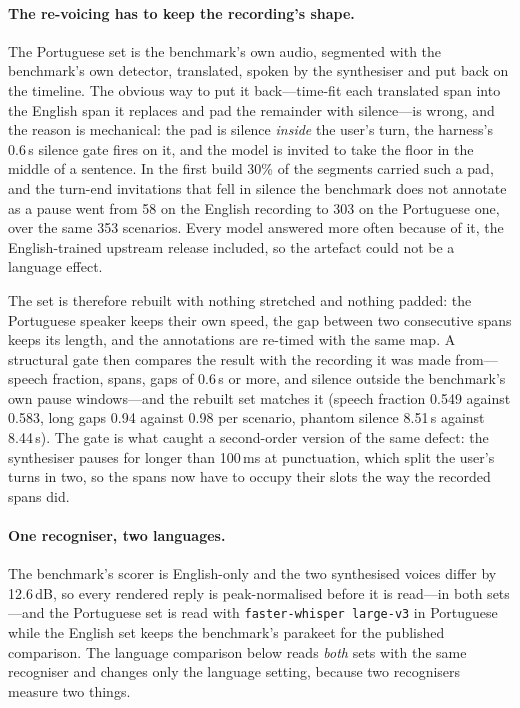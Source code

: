 \documentclass[conference]{IEEEtran}
\begin{document}
\paragraph{The re-voicing has to keep the recording's shape.} The Portuguese set
is the benchmark's own audio, segmented with the benchmark's own detector,
translated, spoken by the synthesiser and put back on the timeline. The obvious
way to put it back---time-fit each translated span into the English span it
replaces and pad the remainder with silence---is wrong, and the reason is
mechanical: the pad is silence \emph{inside} the user's turn, the harness's
0.6\,s silence gate fires on it, and the model is invited to take the floor in
the middle of a sentence. In the first build 30\% of the segments carried such a
pad, and the turn-end invitations that fell in silence the benchmark does not
annotate as a pause went from 58 on the English recording to 303 on the
Portuguese one, over the same 353 scenarios. Every model answered more often
because of it, the English-trained upstream release included, so the artefact
could not be a language effect.

The set is therefore rebuilt with nothing stretched and nothing padded: the
Portuguese speaker keeps their own speed, the gap between two consecutive spans
keeps its length, and the annotations are re-timed with the same map. A
structural gate then compares the result with the recording it was made from---speech
fraction, spans, gaps of 0.6\,s or more, and silence outside the benchmark's own
pause windows---and the rebuilt set matches it (speech fraction 0.549 against
0.583, long gaps 0.94 against 0.98 per scenario, phantom silence 8.51\,s against
8.44\,s). The gate is what caught a second-order version of the same defect:
the synthesiser pauses for longer than 100\,ms at punctuation, which split the
user's turns in two, so the spans now have to occupy their slots the way the
recorded spans did.

\paragraph{One recogniser, two languages.} The benchmark's scorer is English-only
and the two synthesised voices differ by 12.6\,dB, so every rendered reply is
peak-normalised before it is read---in both sets---and the Portuguese set is read
with \texttt{faster-whisper large-v3} in Portuguese while the English set keeps
the benchmark's parakeet for the published comparison. The language comparison
below reads \emph{both} sets with the same recogniser and changes only the
language setting, because two recognisers measure two things.
\end{document}

